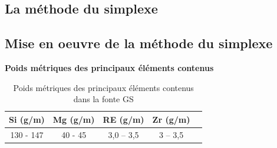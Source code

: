 \documentclass[12pt]{article}
\begin{document}
\subsection{La méthode du simplexe}

\subsection{Mise en oeuvre de la méthode du simplexe}

\begin{table}[H]
    \centering
    \textbf{Poids métriques des principaux éléments contenus}
    \begin{tabular}{|c|c|c|c|c|}
        \hline
        \textbf{Si (g/m)} & \textbf{Mg (g/m)} & \textbf{RE (g/m)} & \textbf{Zr (g/m)} \\
        \hline
        130 - 147 & 40 - 45 & 3,0 – 3,5 & 3 – 3,5 \\
        \hline
    \end{tabular}
    \caption{Poids métriques des principaux éléments contenus dans la fonte GS}
    \label{tab:poids_elements}
\end{table}
\end{document}

